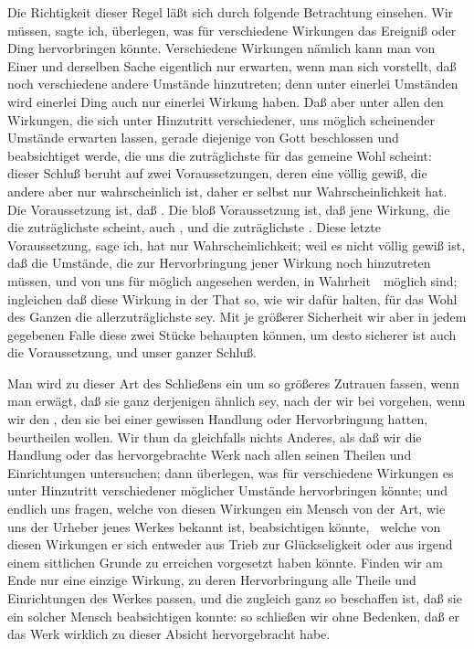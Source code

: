\begin{aufza}
\item Die Richtigkeit dieser Regel läßt sich durch folgende Betrachtung einsehen. Wir müssen, sagte ich, überlegen, was für verschiedene Wirkungen das Ereigniß oder Ding  hervorbringen könnte. Verschiedene Wirkungen nämlich kann man von Einer und derselben Sache eigentlich nur erwarten, wenn man sich vorstellt, daß noch verschiedene andere Umstände hinzutreten; denn unter einerlei Umständen wird einerlei Ding auch nur einerlei Wirkung haben. Daß aber unter allen den Wirkungen, die sich unter Hinzutritt verschiedener, uns möglich scheinender Umstände erwarten lassen, gerade diejenige von Gott beschlossen und beabsichtiget werde, die uns die zuträglichste für das gemeine Wohl scheint: dieser Schluß beruht auf zwei Voraussetzungen, deren eine völlig gewiß, die andere aber nur wahrscheinlich ist, daher er selbst nur Wahrscheinlichkeit hat. Die  Voraussetzung ist, daß . Die bloß  Voraussetzung ist, daß jene Wirkung, die  die zuträglichste scheint, auch , und die zuträglichste . Diese letzte Voraussetzung, sage ich, hat nur Wahrscheinlichkeit; weil es nicht völlig gewiß ist, daß die Umstände, die zur Hervorbringung jener Wirkung noch hinzutreten müssen, und von uns für möglich angesehen werden, in Wahrheit~\ möglich sind; ingleichen daß diese Wirkung in der That so, wie wir dafür halten, für das Wohl des Ganzen die allerzuträglichste sey. Mit je größerer Sicherheit wir aber in jedem gegebenen Falle diese zwei Stücke behaupten können, um desto sicherer ist auch die Voraussetzung, und unser ganzer Schluß.
\item Man wird zu dieser Art des Schließens ein um so größeres Zutrauen fassen, wenn man erwägt, daß sie ganz derjenigen ähnlich sey, nach der wir bei  vorgehen, wenn wir den , den sie bei einer gewissen Handlung oder Hervorbringung hatten, beurtheilen wollen. Wir thun da gleichfalls nichts Anderes, als daß wir die Handlung oder das hervorgebrachte Werk nach allen seinen Theilen und Einrichtungen untersuchen; dann überlegen, was für verschiedene Wirkungen es unter Hinzutritt verschiedener möglicher Umstände hervorbringen könnte; und endlich uns fragen, welche von diesen Wirkungen ein Mensch von der Art, wie uns der Urheber jenes Werkes bekannt ist, beabsichtigen könnte, \dh\ welche von diesen Wirkungen er sich entweder aus Trieb zur Glückseligkeit oder aus irgend einem sittlichen Grunde zu erreichen vorgesetzt haben könnte. Finden wir am Ende nur eine einzige Wirkung, zu deren Hervorbringung alle Theile und Einrichtungen des Werkes passen, und die zugleich ganz so beschaffen ist, daß sie ein solcher Mensch beabsichtigen konnte: so schließen wir ohne Bedenken, daß er das Werk wirklich zu dieser Absicht hervorgebracht habe.

\end{aufza}
